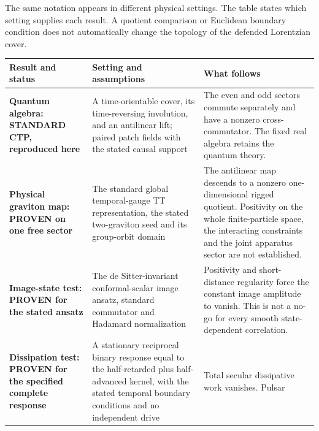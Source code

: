 \documentclass[
]{article}
\newcounter{none} %
\begin{document}
The same notation appears in different physical settings. The table
states which setting supplies each result. A quotient comparison or
Euclidean boundary condition does not automatically change the topology
of the defended Lorentzian cover.

{\def\LTcaptype{none} %
\begin{longtable}[]{@{}
  >{\raggedright\arraybackslash}p{}
  >{\raggedright\arraybackslash}p{}
  >{\raggedright\arraybackslash}p{}@{}}
\toprule\noalign{}
\begin{minipage}[b]{\linewidth}\raggedright
Result and status
\end{minipage} & \begin{minipage}[b]{\linewidth}\raggedright
Setting and assumptions
\end{minipage} & \begin{minipage}[b]{\linewidth}\raggedright
What follows
\end{minipage} \\
\midrule\noalign{}
\endhead
\bottomrule\noalign{}
\endlastfoot
\textbf{Quantum algebra: STANDARD CTP, reproduced here} & A
time-orientable cover, its time-reversing involution, and an antilinear
lift; paired patch fields with the stated causal support & The even and
odd sectors commute separately and have a nonzero cross-commutator. The
fixed real algebra retains the quantum theory. \\
\textbf{Physical graviton map: PROVEN on one free sector} & The standard
global temporal-gauge TT representation, the stated two-graviton seed
and its group-orbit domain & The antilinear map descends to a nonzero
one-dimensional rigged quotient. Positivity on the whole finite-particle
space, the interacting constraints and the joint apparatus sector are
not established. \\
\textbf{Image-state test: PROVEN for the stated ansatz} & The de
Sitter-invariant conformal-scalar image ansatz, standard commutator and
Hadamard normalization & Positivity and short-distance regularity force
the constant image amplitude to vanish. This is not a no-go for every
smooth state-dependent correlation. \\
\textbf{Dissipation test: PROVEN for the specified complete response} &
A stationary reciprocal binary response equal to the half-retarded plus
half-advanced kernel, with the stated temporal boundary conditions and
no independent drive & Total secular dissipative work vanishes. Pulsar

\end{longtable}}
\end{document}
